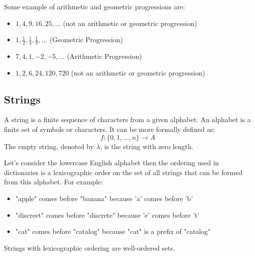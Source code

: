 \begin{eg}
    Some example of arithmetic and geometric progressions are:
    \begin{itemize}[itemsep=1pt,label=$\circ$]
        \item $1,4,9,16,25,\ldots$ (not an arithmetic or geometric progression)
        \item $1,\frac{1}{2},\frac{1}{4},\frac{1}{8},\ldots$ (Geometric Progression)
        \item $7,4,1,-2,-5,\ldots$ (Arithmetic Progression)
        \item $1,2,6,24,120,720$ (not an arithmetic or geometric progression)
    \end{itemize}
\end{eg}

\subsection{Strings}
\begin{definition}[Strings]
    A string is a finite sequence of characters from a given alphabet. An alphabet is a finite set of symbols or characters. It can be more formally defined as:
    \[
        f: \{0,1,\ldots, n\} \to A
    \]
    The empty string, denoted by $\lambda$, is the string with zero length.
\end{definition}

\begin{eg}
    Let's consider the lowercase English alphabet then the ordering used in dictionaries is a lexicographic order on the set of all strings that can be formed from this alphabet. For example:
    \begin{itemize}[itemsep=1pt,label=$\circ$]
        \item "apple" comes before "banana" because 'a' comes before 'b'
        \item "discreet" comes before "discrete" because 'e' comes before 't'
        \item "cat" comes before "catalog" because "cat" is a prefix of "catalog"
    \end{itemize}
    Strings with lexicographic ordering are well-ordered sets.
\end{eg}